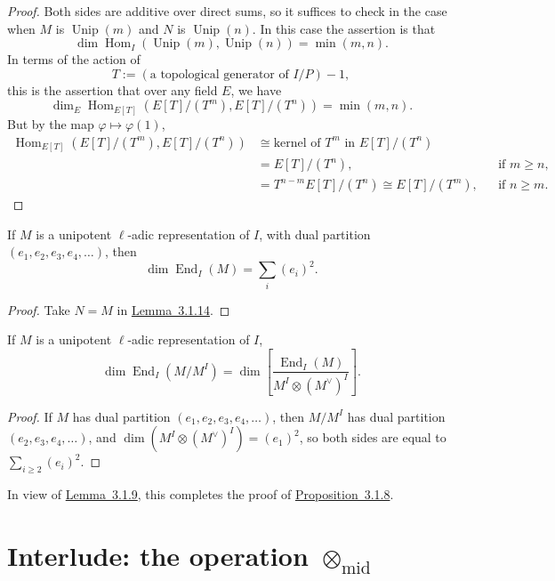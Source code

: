 \begin{proof}
Both sides are additive over direct sums, so it suffices to check in the case
when \(M\) is \(\operatorname{Unip}(m)\) and \(N\) is
\(\operatorname{Unip}(n)\). In this case the assertion is that
\[
  \dim\operatorname{Hom}_I(\operatorname{Unip}(m),\operatorname{Unip}(n))
  =
  \min(m,n).
\]
In terms of the action of
\[
  T:=(\text{a topological generator of }I/P)-1,
\]
this is the assertion that over any field \(E\), we have
\[
  \dim_E\operatorname{Hom}_{E[T]}(E[T]/(T^m),E[T]/(T^n))=\min(m,n).
\]
But by the map \(\varphi\mapsto\varphi(1)\),
\[
\begin{aligned}
  \operatorname{Hom}_{E[T]}(E[T]/(T^m),E[T]/(T^n))
  &\cong \text{kernel of }T^m\text{ in }E[T]/(T^n)\\
  &=E[T]/(T^n), &&\text{if }m\geq n,\\
  &=T^{n-m}E[T]/(T^n)\cong E[T]/(T^m), &&\text{if }n\geq m.
\end{aligned}
\]
\end{proof}

If \(M\) is a unipotent \(\ell\)-adic representation of \(I\), with dual
partition \((e_1,e_2,e_3,e_4,\ldots)\), then
\[
  \dim\operatorname{End}_I(M)=\sum_i(e_i)^2.
\]

\begin{proof}
Take \(N=M\) in \hyperref[lem:3.1.14]{Lemma~3.1.14}.
\end{proof}

If \(M\) is a unipotent \(\ell\)-adic representation of \(I\),
\[
  \dim\operatorname{End}_I(M/M^I)
  =
  \dim\left[
  \frac{\operatorname{End}_I(M)}
       {M^I\otimes(M^{\vee})^I}
  \right].
\]

\begin{proof}
If \(M\) has dual partition \((e_1,e_2,e_3,e_4,\ldots)\), then \(M/M^I\) has
dual partition \((e_2,e_3,e_4,\ldots)\), and
\(\dim(M^I\otimes(M^{\vee})^I)=(e_1)^2\), so both sides are equal to
\(\sum_{i\geq 2}(e_i)^2\).
\end{proof}

In view of \hyperref[lem:3.1.9]{Lemma~3.1.9}, this completes the proof of
\hyperref[prop:3.1.8]{Proposition~3.1.8}.

\section{Interlude: the operation
\texorpdfstring{\(\otimes_{\mathrm{mid}}\)}{tensor-mid}}\label{sec:3.2}

